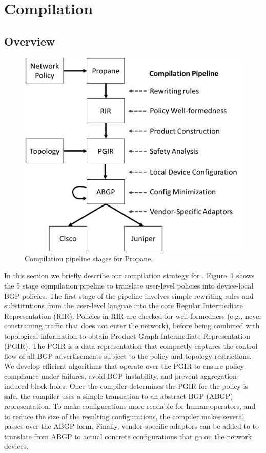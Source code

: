 \section{Compilation}
\label{sec:compilation}


\subsection{Overview}

\begin{figure}[t!]
\centering
\includegraphics[width=\columnwidth]{figures/pipeline}
\caption{Compilation pipeline stages for Propane.}
\label{fig:pipeline}
\end{figure}

In this section we briefly describe our compilation strategy for \sysname. Figure~\ref{fig:pipeline} shows the 5 stage compilation pipeline to translate user-level \sysname policies into device-local BGP policies. The first stage of the pipeline involves simple rewriting rules and substitutions from the user-level languae into the core Regular Intermediate Representation (RIR). Policies in RIR are checked for well-formedness (e.g., never constraining traffic that does not enter the network), before being combined with topological information to obtain Product Graph Intermediate Representation (PGIR). The PGIR is a data representation that compactly captures the control flow of all BGP advertisements subject to the policy and topology restrictions. We develop efficient algorithms that operate over the PGIR to ensure policy compliance under failures, avoid BGP instability, and prevent aggregation-induced black holes. Once the compiler determines the PGIR for the policy is safe, the compiler uses a simple translation to an abstract BGP (ABGP) representation. To make configurations more readable for human operators, and to reduce the size of the resulting configurations, the \sysname compiler makes several passes over the ABGP form. Finally, vendor-specific adaptors can be added to \sysname to translate from ABGP to actual concrete configurations that go on the network devices.


